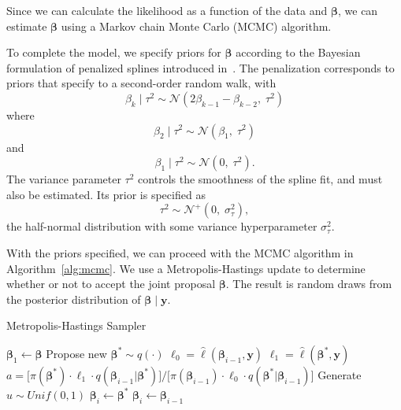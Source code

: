 Since we can calculate the likelihood as a function of the data and $\bm{\beta}$, we can estimate $\bm{\beta}$ using a Markov chain Monte Carlo (MCMC) algorithm. %

To complete the model, we specify priors for $\bm{\beta}$ according to the Bayesian formulation of penalized splines introduced in~\cite{lang2004bayesian}.  The penalization corresponds to priors that specify to a second-order random walk, with
\[
	\beta_k \;|\; \tau^2 \sim \mathcal{N}(2\beta_{k-1} - \beta_{k-2}, \; \tau^2)
\]
where
\[
	\beta_2 \;|\; \tau^2 \sim \mathcal{N}(\beta_1, \; \tau^2)
\]
and
\[
	\beta_1 \;|\; \tau^2 \sim \mathcal{N}(0, \; \tau^2).
\]
The variance parameter $\tau^2$ controls the smoothness of the spline fit, and must also be estimated. Its prior is specified as
\[
	\tau^2 \sim \mathcal{N}^+(0, \; \sigma^2_\tau),
\]
the half-normal distribution with some variance hyperparameter $\sigma^2_\tau$.

With the priors specified, we can proceed with the MCMC algorithm in Algorithm~\ref{alg:mcmc}. We use a Metropolis-Hastings update to determine whether or not to accept the joint proposal $\bm{\beta}$. The result is random draws from the posterior distribution of $\bm{\beta} \;|\; \bm{y}$.

\begin{algorithm}[!htb]
	\caption{\small Metropolis-Hastings Sampler} \label{alg:mcmc}
	\begin{algorithmic}[1]
		\State $\bm{\beta}_1 \gets \bm{\beta}$
		\State Propose new $\bm{\beta}^* \sim q(\cdot)$
		\State $\ell_0 = \hat{\ell}(\bm{\beta}_{i-1}, \bm{y})$
		\State $\ell_1 = \hat{\ell}(\bm{\beta}^*, \bm{y})$
		\State $a = \Big[\pi(\bm{\beta}^*) \cdot \ell_1 \cdot q(\bm{\beta}_{i-1}|\bm{\beta}^*)\Big]/\Big[\pi(\bm{\beta}_{i-1}) \cdot \ell_0 \cdot q(\bm{\beta}^*|\bm{\beta}_{i-1})\Big]$
		\State Generate $u \sim Unif(0, 1)$
		\State $\bm{\beta}_i \gets \bm{\beta}^*$
		\Else
		\State $\bm{\beta}_i \gets \bm{\beta}_{i-1}$
		\EndIf
		\EndFor
		\EndProcedure
	\end{algorithmic}
\end{algorithm} 




